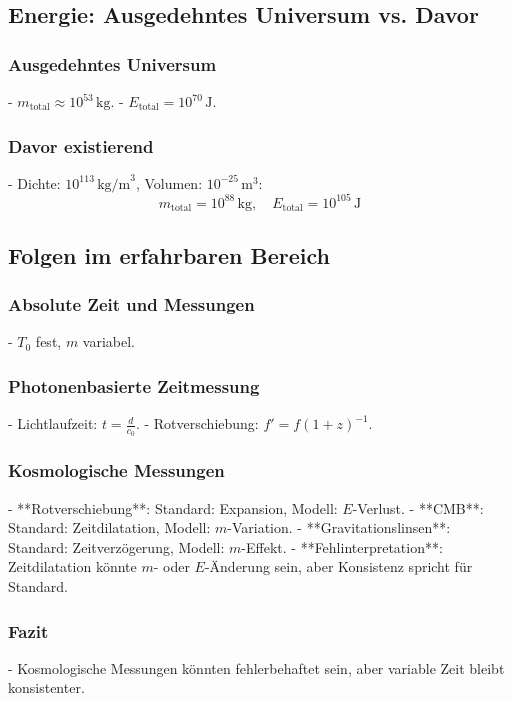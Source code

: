 \documentclass{article}
\begin{document}
	\subsection{Energie: Ausgedehntes Universum vs. Davor}
	
	\subsubsection{Ausgedehntes Universum}
	- \( m_{\text{total}} \approx 10^{53} \, \text{kg} \).
	- \( E_{\text{total}} = 10^{70} \, \text{J} \).
	
	\subsubsection{Davor existierend}
	- Dichte: \( 10^{113} \, \text{kg/m}^3 \), Volumen: \( 10^{-25} \, \text{m}^3 \):
	\[
	m_{\text{total}} = 10^{88} \, \text{kg}, \quad E_{\text{total}} = 10^{105} \, \text{J}
	\]
	
	\subsection{Folgen im erfahrbaren Bereich}
	
	\subsubsection{Absolute Zeit und Messungen}
	- \( T_0 \) fest, \( m \) variabel.
	
	\subsubsection{Photonenbasierte Zeitmessung}
	- Lichtlaufzeit: \( t = \frac{d}{c_0} \).
	- Rotverschiebung: \( f' = f (1 + z)^{-1} \).
	
	\subsubsection{Kosmologische Messungen}
	- **Rotverschiebung**: Standard: Expansion, Modell: \( E \)-Verlust.
	- **CMB**: Standard: Zeitdilatation, Modell: \( m \)-Variation.
	- **Gravitationslinsen**: Standard: Zeitverzögerung, Modell: \( m \)-Effekt.
	- **Fehlinterpretation**: Zeitdilatation könnte \( m \)- oder \( E \)-Änderung sein, aber Konsistenz spricht für Standard.
	
	\subsubsection{Fazit}
	- Kosmologische Messungen könnten fehlerbehaftet sein, aber variable Zeit bleibt konsistenter.
	
\end{document}
